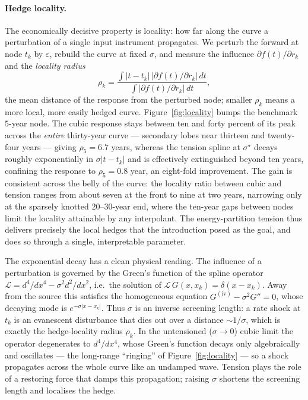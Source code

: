 \documentclass[10pt]{article}
\begin{document}
\paragraph{Hedge locality.} The economically decisive property is locality: how far along the
curve a perturbation of a single input instrument propagates. We perturb the forward at node
$t_k$ by $\varepsilon$, rebuild the curve at fixed $\sigma$, and measure the influence
$\partial f(t)/\partial r_k$ and the \emph{locality radius}
\begin{equation}
\rho_k=\frac{\int |t-t_k|\,\big|\partial f(t)/\partial r_k\big|\,dt}
{\int \big|\partial f(t)/\partial r_k\big|\,dt},
\label{eq:rho}
\end{equation}
the mean distance of the response from the perturbed node; smaller $\rho_k$ means a more local,
more easily hedged curve. Figure~\ref{fig:locality} bumps the benchmark $5$-year node. The
cubic response stays between ten and forty percent of its peak across the \emph{entire}
thirty-year curve --- secondary lobes near thirteen and twenty-four years --- giving
$\rho_5=6.7$ years, whereas the tension spline at $\sigma^\star$ decays roughly exponentially in
$\sigma|t-t_k|$ and is effectively extinguished beyond ten years, confining the response to
$\rho_5=0.8$ year, an eight-fold improvement. The gain is consistent across the belly of the
curve: the locality ratio between cubic and tension ranges from about seven at the front to
nine at two years, narrowing only at the sparsely knotted $20$--$30$-year end, where the
ten-year gaps between nodes limit the locality attainable by any interpolant. The
energy-partition tension thus delivers precisely the local hedges that the introduction posed
as the goal, and does so through a single, interpretable parameter.

The exponential decay has a clean physical reading. The influence of a perturbation is governed
by the Green's function of the spline operator $\mathcal{L}=d^4/dx^4-\sigma^2 d^2/dx^2$, i.e.\ the
solution of $\mathcal{L}\,G(x,x_k)=\delta(x-x_k)$. Away from the source this satisfies the
homogeneous equation $G^{(\mathrm{iv})}-\sigma^2 G''=0$, whose decaying mode is $e^{-\sigma|x-x_k|}$.
Thus $\sigma$ is an inverse screening length: a rate shock at $t_k$ is an evanescent disturbance
that dies out over a distance $\sim1/\sigma$, which is exactly the hedge-locality radius
$\rho_k$. In the untensioned ($\sigma\to0$) cubic limit the operator degenerates to
$d^4/dx^4$, whose Green's function decays only algebraically and oscillates --- the long-range
``ringing'' of Figure~\ref{fig:locality} --- so a shock propagates across the whole curve like an
undamped wave. Tension plays the role of a restoring force that damps this propagation; raising
$\sigma$ shortens the screening length and localises the hedge.
\end{document}
